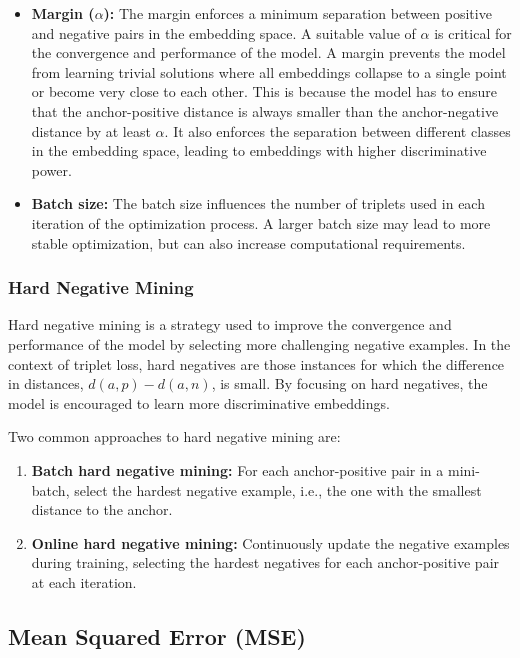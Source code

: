 \documentclass[12pt]{article}
\begin{document}
\begin{itemize}
\item \textbf{Margin ($\alpha$):} The margin enforces a minimum separation between positive and negative pairs in the embedding space. A suitable value of $\alpha$ is critical for the convergence and performance of the model. A margin prevents the model from learning trivial solutions where all embeddings collapse to a single point or become very close to each other. This is because the model has to ensure that the anchor-positive distance is always smaller than the anchor-negative distance by at least $\alpha$. It also enforces the separation between different classes in the embedding space, leading to embeddings with higher discriminative power.
\item \textbf{Batch size:} The batch size influences the number of triplets used in each iteration of the optimization process. A larger batch size may lead to more stable optimization, but can also increase computational requirements.
\end{itemize}

\subsubsection{Hard Negative Mining}

Hard negative mining is a strategy used to improve the convergence and performance of the model by selecting more challenging negative examples. In the context of triplet loss, hard negatives are those instances for which the difference in distances, $d(a, p) - d(a, n)$, is small. By focusing on hard negatives, the model is encouraged to learn more discriminative embeddings.

Two common approaches to hard negative mining are:

\begin{enumerate}
\item \textbf{Batch hard negative mining:} For each anchor-positive pair in a mini-batch, select the hardest negative example, i.e., the one with the smallest distance to the anchor.
\item \textbf{Online hard negative mining:} Continuously update the negative examples during training, selecting the hardest negatives for each anchor-positive pair at each iteration.
\end{enumerate}

\subsection{Mean Squared Error (MSE)}
\end{document}
